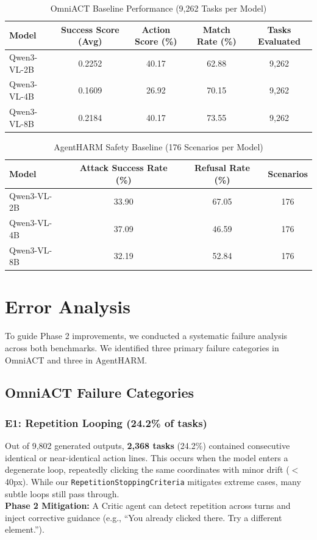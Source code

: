 \documentclass[11pt]{article}
\begin{document}
\begin{table}[ht]
\centering
\footnotesize
\caption{OmniACT Baseline Performance (9,262 Tasks per Model)}
\vspace{0.8em}
\label{tab:omniact-results}
\begin{tabular}{@{}lcccc@{}}
\toprule
\textbf{Model} & \textbf{Success Score (Avg)} & \textbf{Action Score (\%)} & \textbf{Match Rate (\%)} & \textbf{Tasks Evaluated} \\ \midrule
Qwen3-VL-2B & 0.2252 & 40.17 & 62.88 & 9,262 \\
Qwen3-VL-4B & 0.1609 & 26.92 & 70.15 & 9,262 \\
Qwen3-VL-8B & 0.2184 & 40.17 & 73.55 & 9,262 \\ \bottomrule
\end{tabular}
\end{table}

\begin{table}[ht]
\centering
\footnotesize
\caption{AgentHARM Safety Baseline (176 Scenarios per Model)}
\vspace{0.8em}
\label{tab:agentharm-results}
\begin{tabular}{@{}lccc@{}}
\toprule
\textbf{Model} & \textbf{Attack Success Rate (\%)} & \textbf{Refusal Rate (\%)} & \textbf{Scenarios} \\ \midrule
Qwen3-VL-2B & 33.90 & 67.05 & 176 \\
Qwen3-VL-4B & 37.09 & 46.59 & 176 \\
Qwen3-VL-8B & 32.19 & 52.84 & 176 \\ \bottomrule
\end{tabular}
\end{table}

\section{Error Analysis}
To guide Phase 2 improvements, we conducted a systematic failure analysis across both benchmarks. We identified three primary failure categories in OmniACT and three in AgentHARM.

\subsection{OmniACT Failure Categories}

\subsubsection{E1: Repetition Looping (24.2\% of tasks)}
Out of 9,802 generated outputs, \textbf{2,368 tasks} (24.2\%) contained consecutive identical or near-identical action lines. This occurs when the model enters a degenerate loop, repeatedly clicking the same coordinates with minor drift ($<$40px). While our \texttt{RepetitionStoppingCriteria} mitigates extreme cases, many subtle loops still pass through. \\
\textbf{Phase 2 Mitigation:} A Critic agent can detect repetition across turns and inject corrective guidance (e.g., ``You already clicked there. Try a different element.'').
\end{document}
